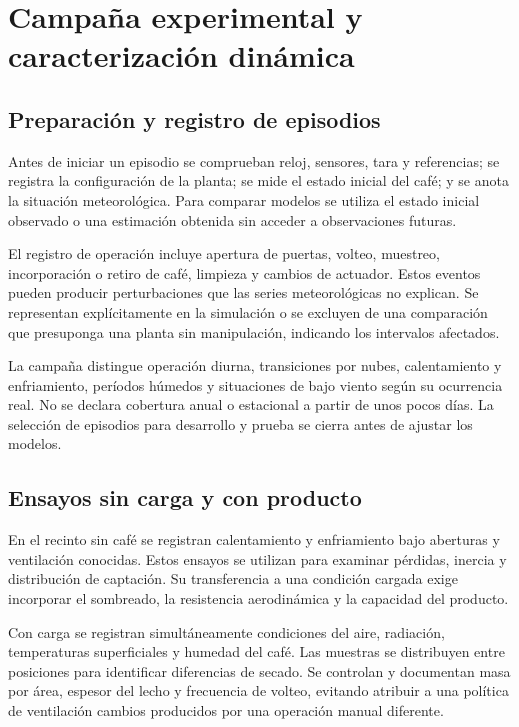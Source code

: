 \section{Campaña experimental y caracterización dinámica}
\label{met:campana}

\subsection{Preparación y registro de episodios}

Antes de iniciar un episodio se comprueban reloj, sensores, tara y referencias; se registra la configuración de la planta; se mide el estado inicial del café; y se anota la situación meteorológica. Para comparar modelos se utiliza el estado inicial observado o una estimación obtenida sin acceder a observaciones futuras.

El registro de operación incluye apertura de puertas, volteo, muestreo, incorporación o retiro de café, limpieza y cambios de actuador. Estos eventos pueden producir perturbaciones que las series meteorológicas no explican. Se representan explícitamente en la simulación o se excluyen de una comparación que presuponga una planta sin manipulación, indicando los intervalos afectados.

La campaña distingue operación diurna, transiciones por nubes, calentamiento y enfriamiento, períodos húmedos y situaciones de bajo viento según su ocurrencia real. No se declara cobertura anual o estacional a partir de unos pocos días. La selección de episodios para desarrollo y prueba se cierra antes de ajustar los modelos.

\subsection{Ensayos sin carga y con producto}

En el recinto sin café se registran calentamiento y enfriamiento bajo aberturas y ventilación conocidas. Estos ensayos se utilizan para examinar pérdidas, inercia y distribución de captación. Su transferencia a una condición cargada exige incorporar el sombreado, la resistencia aerodinámica y la capacidad del producto.

Con carga se registran simultáneamente condiciones del aire, radiación, temperaturas superficiales y humedad del café. Las muestras se distribuyen entre posiciones para identificar diferencias de secado. Se controlan y documentan masa por área, espesor del lecho y frecuencia de volteo, evitando atribuir a una política de ventilación cambios producidos por una operación manual diferente.


